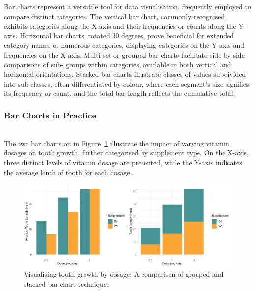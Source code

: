 \documentclass{article}\usepackage[]{graphicx}\usepackage[]{xcolor}
\makeatletter
\def\maxwidth{ %
  \ifdim\Gin@nat@width>\linewidth
    \linewidth
  \else
    \Gin@nat@width
  \fi
}
\newenvironment{knitrout}{}{} %
\numberwithin{equation}{section}
\makeatother
\begin{document}
\noindent Bar charts represent a versatile tool for data visualisation, frequently employed to compare distinct categories. The vertical bar chart, commonly recognised, exhibits categories along the X-axis and their frequencies or counts along the Y-axis. Horizontal bar charts, rotated 90 degrees, prove beneficial for extended category names or numerous categories, displaying categories on the Y-axis and frequencies on the X-axis. Multi-set or grouped bar charts facilitate side-by-side comparisons of sub- groups within categories, available in both vertical and horizontal orientations. Stacked bar charts illustrate classes of values subdivided into sub-classes, often differentiated by colour, where each segment's size signifies its frequency or count, and the total bar length reflects the cumulative total.

\subsubsection{Bar Charts in Practice}\\
\noident The two bar charts on in Figure~\ref{fig:barcharts} illustrate the impact of varying vitamin dosages on tooth growth, further categorised by supplement type. On the X-axis, three distinct levels of vitamin dosage are presented, while the Y-axis indicates the average lenth of tooth for each dosage.


\begin{knitrout}\scriptsize
{}\color{fgcolor}\begin{figure}[H]

{\centering \includegraphics[width=\maxwidth]{figure/beamer-barcharts-1} 

}

\caption[Visualising tooth growth by dosage]{Visualising tooth growth by dosage: A comparison of grouped and stacked bar chart techniques}\label{fig:barcharts}
\end{figure}

\end{knitrout}
\end{document}
